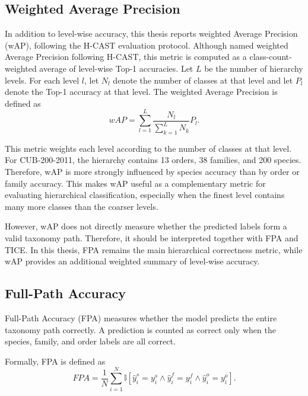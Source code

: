 \subsection{Weighted Average Precision}

In addition to level-wise accuracy, this thesis reports weighted Average Precision (wAP), following the H-CAST evaluation protocol. Although named weighted Average Precision following H-CAST, this metric is computed as a class-count-weighted average of level-wise Top-1 accuracies. Let \(L\) be the number of hierarchy levels. For each level \(l\), let \(N_l\) denote the number of classes at that level and let \(P_l\) denote the Top-1 accuracy at that level. The weighted Average Precision is defined as
\begin{equation}
    wAP =
    \sum_{l=1}^{L}
    \frac{N_l}{\sum_{k=1}^{L} N_k}
    P_l.
\end{equation}


This metric weights each level according to the number of classes at that level. For CUB-200-2011, the hierarchy contains 13 orders, 38 families, and 200 species. Therefore, wAP is more strongly influenced by species accuracy than by order or family accuracy. This makes wAP useful as a complementary metric for evaluating hierarchical classification, especially when the finest level contains many more classes than the coarser levels.

However, wAP does not directly measure whether the predicted labels form a valid taxonomy path. Therefore, it should be interpreted together with FPA and TICE. In this thesis, FPA remains the main hierarchical correctness metric, while wAP provides an additional weighted summary of level-wise accuracy.

\subsection{Full-Path Accuracy}

Full-Path Accuracy (FPA) measures whether the model predicts the entire taxonomy path correctly. A prediction is counted as correct only when the species, family, and order labels are all correct.

Formally, FPA is defined as
\begin{equation}
    FPA =
    \frac{1}{N}
    \sum_{i=1}^{N}
    \mathbb{I}
    \left[
        \hat{y}_i^{s}=y_i^{s}
        \land
        \hat{y}_i^{f}=y_i^{f}
        \land
        \hat{y}_i^{o}=y_i^{o}
    \right].
\end{equation}

